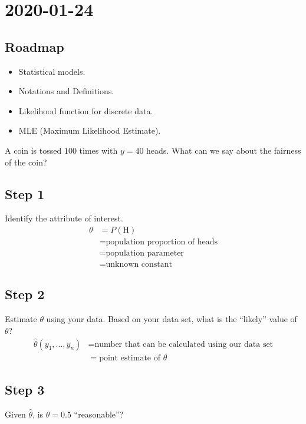 \section{2020-01-24}
\subsection*{Roadmap}
\begin{itemize}
    \item Statistical models.
    \item Notations and Definitions.
    \item Likelihood function for discrete data.
    \item MLE (Maximum Likelihood Estimate).
\end{itemize}
\begin{Example}{}{}
    A coin is tossed $ 100 $ times with $ y=40 $ heads. What can we say
    about the fairness of the coin?
\end{Example}
\subsection*{Step 1}
Identify the attribute of interest.
\begin{align*}
    \theta & =P(\text{H})                           \\
           & =\text{population proportion of heads} \\
           & =\text{population parameter}           \\
           & =\text{unknown constant}
\end{align*}
\subsection*{Step 2}
Estimate $ \theta $ using your data. Based on your data
set, what is the ``likely'' value of $ \theta $?
\begin{align*}
    \hat{\theta}(y_1,\ldots ,y_n) & =
    \text{number that can be calculated using our data set}           \\
                                  & =\text{point estimate of } \theta
\end{align*}
\subsection*{Step 3}
Given $ \hat{\theta} $, is $ \theta=0.5 $ ``reasonable''?
